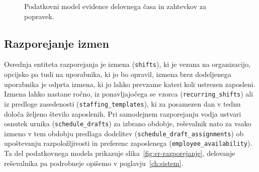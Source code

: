 \begin{figure}[htbp]
\centering
{}
\caption{Podatkovni model evidence delovnega časa in zahtevkov za popravek.}
\label{fig:er-delovni-cas}
\end{figure}
\FloatBarrier

\subsection{Razporejanje izmen}

Osrednja entiteta razporejanja je izmena (\texttt{shifts}), ki je vezana na organizacijo, opcijsko pa tudi na uporabnika, ki jo bo opravil, izmena brez dodeljenega uporabnika je odprta izmena, ki jo lahko prevzame kateri koli ustrezen zaposleni. Izmena lahko nastane ročno, iz ponavljajočega se vzorca (\texttt{recurring\_shifts}) ali iz predloge zasedenosti (\texttt{staffing\_templates}), ki za posamezen dan v tednu določa željeno število zaposlenih. Pri samodejnem razporejanju vodja ustvari osnutek urnika (\texttt{schedule\_drafts}) za izbrano obdobje, reševalnik nato za vsako izmeno v tem obdobju predlaga dodelitev (\texttt{schedule\_draft\_assignments}) ob upoštevanju razpoložljivosti in preferenc zaposlenega (\texttt{employee\_availability}). Ta del podatkovnega modela prikazuje slika~\ref{fig:er-razporejanje}, delovanje reševalnika pa podrobneje opišemo v poglavju~\ref{ch:sistem}.


